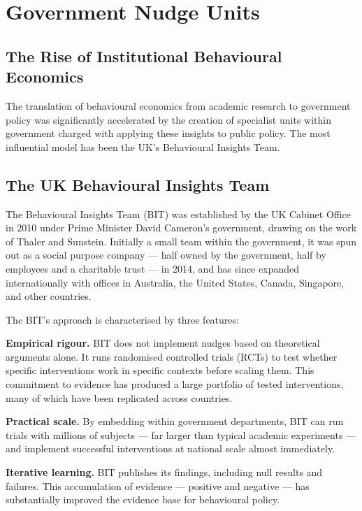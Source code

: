 \documentclass[12pt, letterpaper]{article}
\begin{document}
\medskip


\section{Government Nudge Units}



\subsection{The Rise of Institutional Behavioural Economics}


The translation of behavioural economics from academic research to government policy was significantly accelerated by the creation of specialist units within government charged with applying these insights to public policy. The most influential model has been the UK's Behavioural Insights Team.


\subsection{The UK Behavioural Insights Team}


The Behavioural Insights Team (BIT) was established by the UK Cabinet Office in 2010 under Prime Minister David Cameron's government, drawing on the work of Thaler and Sunstein. Initially a small team within the government, it was spun out as a social purpose company --- half owned by the government, half by employees and a charitable trust --- in 2014, and has since expanded internationally with offices in Australia, the United States, Canada, Singapore, and other countries.

The BIT's approach is characterised by three features:

\textbf{Empirical rigour.} BIT does not implement nudges based on theoretical arguments alone. It runs randomised controlled trials (RCTs) to test whether specific interventions work in specific contexts before scaling them. This commitment to evidence has produced a large portfolio of tested interventions, many of which have been replicated across countries.

\textbf{Practical scale.} By embedding within government departments, BIT can run trials with millions of subjects --- far larger than typical academic experiments --- and implement successful interventions at national scale almost immediately.

\textbf{Iterative learning.} BIT publishes its findings, including null results and failures. This accumulation of evidence --- positive and negative --- has substantially improved the evidence base for behavioural policy.
\end{document}
